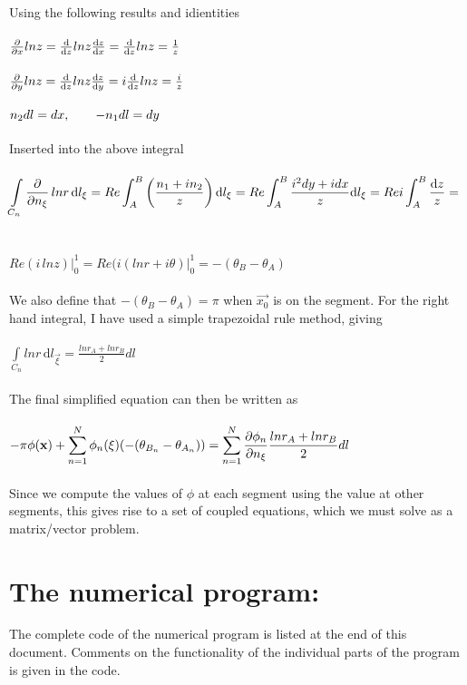 \documentclass[a4paper,english,11pt,twoside]{article}
\newcommand{\tab}{\hspace*{2em}}
\begin{document}
\\
Using the following results and idientities\\
\\
$\frac{\partial }{\partial x}lnz = \frac{\mathrm d}{\mathrm d z}lnz\frac{\mathrm d z}{\mathrm d x} = \frac{\mathrm d}{\mathrm d z}lnz = \frac{1}{z}$\\
\\
$\frac{\partial }{\partial y}lnz = \frac{\mathrm d}{\mathrm d z}lnz\frac{\mathrm d z}{\mathrm d y} = i\frac{\mathrm d}{\mathrm d z}lnz = \frac{i}{z}$\\
\\
$n_2dl = dx,\tab -n_1dl = dy$
\\
\\
Inserted into the above integral\\
\\
$\displaystyle\int\limits_{C_n}\frac{\partial }{\partial n_{\mathbf{\xi}}}\, lnr\, \mathrm{d}l_{\mathbf{\xi}} = Re\displaystyle\int_A^B\left(\frac{n_1 + in_2}{z}\right) \mathrm{d}l_{\mathbf{\xi}} = Re\displaystyle\int_A^B\frac{i^2dy + idx}{z} \mathrm{d}l_{\mathbf{\xi}} = Re i\displaystyle\int_A^B\frac{\mathrm d z}{z} = $\\
\\
\\
$Re(i\, lnz)\big|_0^1 = Re(i(lnr + i\theta)\big|_0^1 = -(\theta_B - \theta_A)$\\
\\We also define that $-(\theta_B - \theta_A)=\pi$ when $\vec{x_0}$ is on the segment.
\newpage
For the right hand integral, I have used a simple trapezoidal rule method, giving\\
\\
$\int\limits_{C_n} lnr\, \mathrm{d}l_{\vec{\xi}} = \frac{lnr_A + lnr_B}{2}dl$\\
\\
The final simplified equation can then be written as\\
\\
$-\pi\phi(\mathbf{x}) +\displaystyle\displaystyle\sum_{n=1}^{N}\phi_n(\mathbf{\xi})(-(\theta_{B_n} - \theta_{A_n})) = \displaystyle\displaystyle\sum_{n=1}^{N}\frac{\partial \phi_n}{\partial n_{\mathbf{\xi}}}\frac{lnr_A + lnr_B}{2}dl$\\
\\
Since we compute the values of $\phi$ at each segment using the value at other segments, this gives rise to a set of coupled equations, which we must solve as a matrix/vector problem.
\section*{The numerical program:}
The complete code of the numerical program is listed at the end of this document. Comments on the functionality of the individual parts of the program is given in the code.\\
\end{document}
